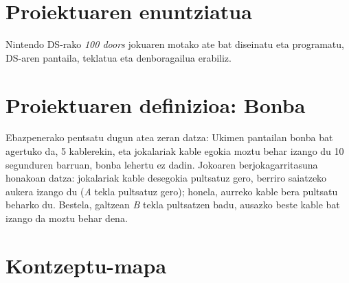 \documentclass[dvipsnames]{../../../../AritzhClass}
\author{Aritz Lopez}
\begin{document}
\izenburuorrialdea

\tableofcontents

\pagebreak

\section{Proiektuaren enuntziatua}

Nintendo DS-rako \textit{100 doors} jokuaren motako ate bat diseinatu eta programatu, DS-aren pantaila, teklatua eta denboragailua erabiliz.

\section{Proiektuaren definizioa: Bonba}

Ebazpenerako pentsatu dugun atea zeran datza: Ukimen pantailan bonba bat agertuko da, 5 kablerekin, eta jokalariak kable egokia moztu behar izango du 10 segunduren barruan, bonba lehertu ez dadin. Jokoaren berjokagarritasuna honakoan datza: jokalariak kable desegokia pultsatuz gero, berriro saiatzeko aukera izango du (\textit{A} tekla pultsatuz gero); honela, aurreko kable bera pultsatu beharko du. Bestela, galtzean \textit{B} tekla pultsatzen badu, ausazko beste kable bat izango da moztu behar dena.

\section{Kontzeptu-mapa}

\end{document}

